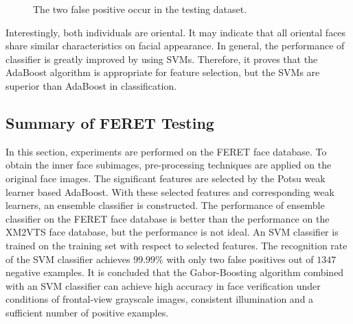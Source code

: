 \begin{figure}[ht]
\begin{center}
  \caption{The two false positive occur in the testing dataset.}
\label{fig:twofalsenegatives}
 \end{center}
\end{figure} 
Interestingly, both individuals are oriental. It may indicate that all oriental faces share similar characteristics on facial appearance. In general, the performance of classifier is greatly improved by using SVMs. Therefore, it proves that the AdaBoost algorithm is appropriate for feature selection, but the SVMs are superior than AdaBoost in classification.

\subsection{Summary of FERET Testing}
In this section, experiments are performed on the \mbox{FERET} face database. To obtain the inner face subimages, pre-processing techniques are applied on the original face images. The significant features are selected by the Potsu weak learner based AdaBoost. With these selected features and corresponding weak learners, an ensemble classifier is constructed. The performance of ensemble classifier on the \mbox{FERET} face database is better than the performance on the \mbox{XM2VTS} face database, but the performance is not ideal. An SVM classifier is trained on the training set with respect to selected features. The recognition rate of the SVM classifier achieves $99.99\%$ with only two false positives out of $1347$ negative examples. It is concluded that the Gabor-Boosting algorithm combined with an SVM classifier can achieve high accuracy in face verification under conditions of frontal-view grayscale images, consistent illumination and a sufficient number of positive examples.

